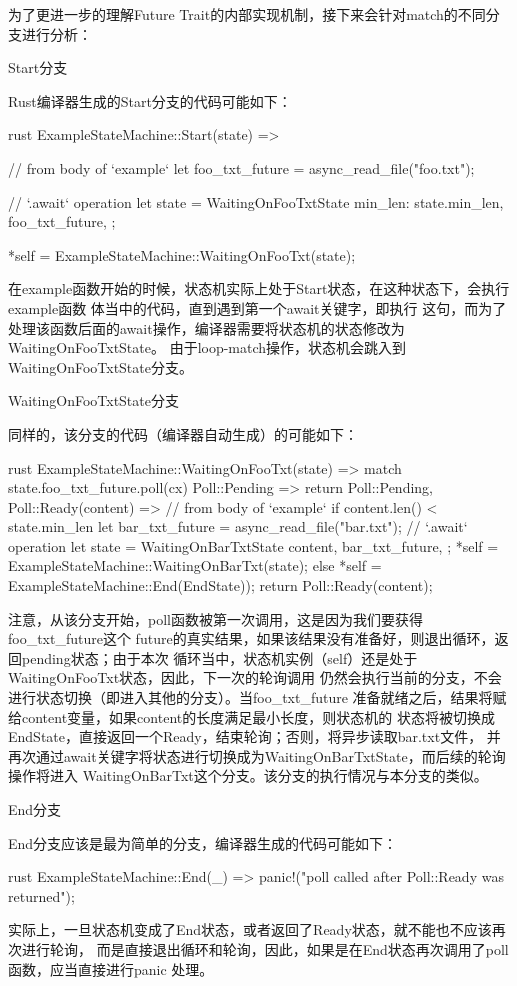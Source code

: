 为了更进一步的理解Future Trait的内部实现机制，接下来会针对match的不同分支进行分析：
\begin{outline}[enumerate]
\1 Start分支

Rust编译器生成的Start分支的代码可能如下：
\begin{code-block}{rust}
ExampleStateMachine::Start(state) => {
    // from body of `example`
    let foo_txt_future = async_read_file("foo.txt");

    // `.await` operation
    let state = WaitingOnFooTxtState {
        min_len: state.min_len,
        foo_txt_future,
    };

    *self = ExampleStateMachine::WaitingOnFooTxt(state);
}
\end{code-block}
在example函数开始的时候，状态机实际上处于Start状态，在这种状态下，会执行example函数
体当中的代码，直到遇到第一个await关键字，即执行
这句，而为了处理该函数后面的await操作，编译器需要将状态机的状态修改为WaitingOnFooTxtState。
由于loop-match操作，状态机会跳入到WaitingOnFooTxtState分支。

\1 WaitingOnFooTxtState分支

同样的，该分支的代码（编译器自动生成）的可能如下：
\begin{code-block}{rust}
ExampleStateMachine::WaitingOnFooTxt(state) => {
    match state.foo_txt_future.poll(cx) {
        Poll::Pending => return Poll::Pending,
        Poll::Ready(content) => {
            // from body of `example`
            if content.len() < state.min_len {
                let bar_txt_future = async_read_file("bar.txt");
                // `.await` operation
                let state = WaitingOnBarTxtState {
                    content,
                    bar_txt_future,
                };
                *self = ExampleStateMachine::WaitingOnBarTxt(state);
            } else {
                *self = ExampleStateMachine::End(EndState));
                return Poll::Ready(content);
            }
        }
    }
}
\end{code-block}
注意，从该分支开始，poll函数被第一次调用，这是因为我们要获得foo\_txt\_future这个
future的真实结果，如果该结果没有准备好，则退出循环，返回pending状态；由于本次
循环当中，状态机实例（self）还是处于WaitingOnFooTxt状态，因此，下一次的轮询调用
仍然会执行当前的分支，不会进行状态切换（即进入其他的分支）。当foo\_txt\_future
准备就绪之后，结果将赋给content变量，如果content的长度满足最小长度，则状态机的
状态将被切换成EndState，直接返回一个Ready，结束轮询；否则，将异步读取bar.txt文件，
并再次通过await关键字将状态进行切换成为WaitingOnBarTxtState，而后续的轮询操作将进入
WaitingOnBarTxt这个分支。该分支的执行情况与本分支的类似。

\1 End分支

End分支应该是最为简单的分支，编译器生成的代码可能如下：
\begin{code-block}{rust}
ExampleStateMachine::End(_) => {
    panic!("poll called after Poll::Ready was returned");
}
\end{code-block}

实际上，一旦状态机变成了End状态，或者返回了Ready状态，就不能也不应该再次进行轮询，
而是直接退出循环和轮询，因此，如果是在End状态再次调用了poll函数，应当直接进行panic
处理。
\end{outline}

